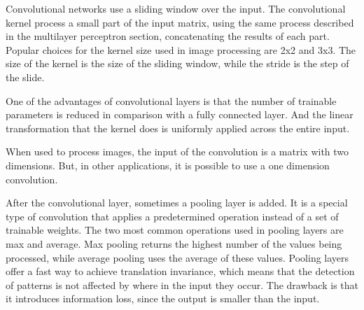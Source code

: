 Convolutional networks \cite{lecun_backpropagation_1989}\cite{lecun_convolutional_1995} use a sliding window over the input. The convolutional kernel process a small part of the input matrix, using the same process described in the multilayer perceptron section, concatenating the results of each part. Popular choices for the kernel size used in image processing are 2x2 and 3x3. The size of the kernel is the size of the sliding window, while the stride  is the step of the slide.

One of the advantages of convolutional layers is that the number of trainable parameters is reduced in comparison with a fully connected layer. And the linear transformation that the kernel does is uniformly applied across the entire input.

When used to process images, the input of the convolution is a matrix with two dimensions. But, in other applications, it is possible to use a one dimension convolution.

After the convolutional layer, sometimes a pooling layer is added. It is a special type of convolution that applies a predetermined operation instead of a set of trainable weights. The two most common operations used in pooling layers are max and average. Max pooling returns the highest number of the values being processed, while average pooling uses the average of these values. Pooling layers offer a fast way to achieve translation invariance, which means that the detection of patterns is not affected by where in the input they occur. The drawback is that it introduces information loss, since the output is smaller than the input.